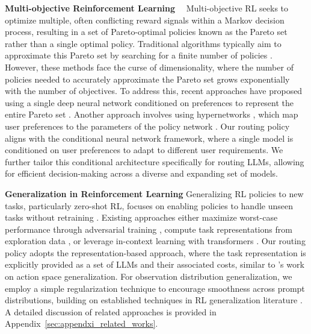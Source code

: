 \textbf{Multi-objective Reinforcement Learning}~~
Multi-objective RL seeks to optimize multiple, often conflicting reward signals within a Markov decision process, resulting in a set of Pareto-optimal policies known as the Pareto set rather than a single optimal policy. Traditional algorithms typically aim to approximate this Pareto set by searching for a finite number of policies \citep{van2014multi,parisi2014policy,xu2020prediction}. However, these methods face the curse of dimensionality, where the number of policies needed to accurately approximate the Pareto set grows exponentially with the number of objectives. To address this, recent approaches have proposed using a single deep neural network conditioned on preferences to represent the entire Pareto set \citep{yang2019generalized,abels2019dynamic,basaklar2022pd}. Another approach involves using hypernetworks \citep{chauhan2023brief}, which map user preferences to the parameters of the policy network \citep{shu2024learning}. Our routing policy aligns with the conditional neural network framework, where a single model is conditioned on user preferences to adapt to different user requirements. We further tailor this conditional architecture specifically for routing LLMs, allowing for efficient decision-making across a diverse and expanding set of models.

\textbf{Generalization in Reinforcement Learning}\quad
Generalizing RL policies to new tasks, particularly zero-shot RL, focuses on enabling policies to handle unseen tasks without retraining \citep{korkmaz2024survey}. Existing approaches either maximize worst-case performance through adversarial training \citep{moos2022robust,dong2023robust}, compute task representations from exploration data \citep{touati2021learning,agarwal2021contrastive,benjamins2022contextualize,ingebrand2024zero}, or leverage in-context learning with transformers \citep{melo2022transformers,brohan2022rt}. Our routing policy adopts the representation-based approach, where the task representation is explicitly provided as a set of LLMs and their associated costs, similar to \citet{jain2020generalization}'s work on action space generalization. For observation distribution generalization, we employ a simple regularization technique to encourage smoothness across prompt distributions, building on established techniques in RL generalization literature \citep{cobbe2019quantifying,zhang2021generalization}. A detailed discussion of related approaches is provided in Appendix~\ref{sec:appendxi_related_works}.

\vspace{-4pt}